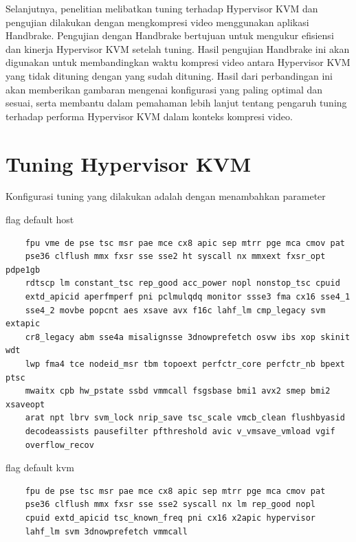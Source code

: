 Selanjutnya, penelitian melibatkan tuning terhadap Hypervisor KVM dan pengujian dilakukan dengan mengkompresi video menggunakan aplikasi Handbrake. Pengujian dengan Handbrake bertujuan untuk mengukur efisiensi dan kinerja Hypervisor KVM setelah tuning. Hasil pengujian Handbrake ini akan digunakan untuk membandingkan waktu kompresi video antara Hypervisor KVM yang tidak dituning dengan yang sudah dituning. Hasil dari perbandingan ini akan memberikan gambaran mengenai konfigurasi yang paling optimal dan sesuai, serta membantu dalam pemahaman lebih lanjut tentang pengaruh tuning terhadap performa Hypervisor KVM dalam konteks kompresi video.

\section{Tuning Hypervisor KVM}
Konfigurasi tuning yang dilakukan adalah dengan menambahkan parameter 

flag default host
\begin{verbatim}
	fpu vme de pse tsc msr pae mce cx8 apic sep mtrr pge mca cmov pat 
	pse36 clflush mmx fxsr sse sse2 ht syscall nx mmxext fxsr_opt pdpe1gb 
	rdtscp lm constant_tsc rep_good acc_power nopl nonstop_tsc cpuid 
	extd_apicid aperfmperf pni pclmulqdq monitor ssse3 fma cx16 sse4_1 
	sse4_2 movbe popcnt aes xsave avx f16c lahf_lm cmp_legacy svm extapic 
	cr8_legacy abm sse4a misalignsse 3dnowprefetch osvw ibs xop skinit wdt 
	lwp fma4 tce nodeid_msr tbm topoext perfctr_core perfctr_nb bpext ptsc 
	mwaitx cpb hw_pstate ssbd vmmcall fsgsbase bmi1 avx2 smep bmi2 xsaveopt 
	arat npt lbrv svm_lock nrip_save tsc_scale vmcb_clean flushbyasid 
	decodeassists pausefilter pfthreshold avic v_vmsave_vmload vgif 
	overflow_recov
\end{verbatim}


flag default kvm
\begin{verbatim}
	fpu de pse tsc msr pae mce cx8 apic sep mtrr pge mca cmov pat 
	pse36 clflush mmx fxsr sse sse2 syscall nx lm rep_good nopl 
	cpuid extd_apicid tsc_known_freq pni cx16 x2apic hypervisor 
	lahf_lm svm 3dnowprefetch vmmcall
\end{verbatim}


